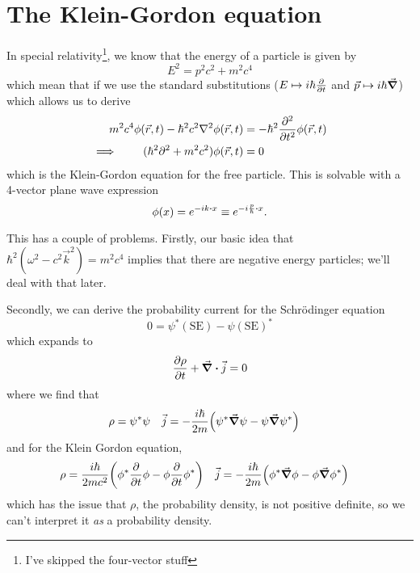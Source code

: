 \documentclass[]{revision-notes}
\begin{document}
\section{The Klein-Gordon equation}
In special relativity\footnote{I've skipped the four-vector stuff}, we know that the energy of a particle is given by
\[ E^2 = p^2 c^2 + m^2 c^4 \]
which mean that if we use the standard substitutions (\(E \mapsto i\hbar \pdv{t}\) and \(\vec{p}\mapsto i\hbar\grad\)) which allows us to derive
\begin{align*}
  m^2 c^4 \phi(\vec{r}, t) - \hbar^2 c^2 \laplacian \phi(\vec{r}, t) &= -\hbar^2 \pdv[2]{t}\phi(\vec{r}, t)\\
  \implies \qquad (\hbar^2\partial^2 + m^2 c^2)\phi(\vec{r}, t) &= 0
\end{align*}
which is the Klein-Gordon equation for the free particle. This is solvable with a 4-vector plane wave expression \[\phi(x) = e^{-ik\vdot x} \equiv e^{-i\frac{p}{\hbar}\vdot x}.\]

This has a couple of problems.
Firstly, our basic idea that \(\hbar^2( \omega^2 - c^2 \vec{k}^2 ) = m^2 c^4\) implies that there are negative energy particles; we'll deal with that later.

Secondly, we can derive the probability current for the Schr\"odinger equation \[0 = \psi^\ast (\text{SE})  - \psi (\text{SE})^\ast \] which expands to
\[\pdv{\rho}{t} + \div\vec{j} = 0\]
where we find that
\begin{align*}
  \rho &= \psi^\ast \psi & \vec{j} &= -\frac{i\hbar}{2m}\qty(\psi^\ast \grad\psi - \psi \grad\psi^\ast)
\end{align*}
and for the Klein Gordon equation,
\begin{align*}
  \rho &= \frac{i\hbar}{2mc^2}\qty(\phi^\ast \pdv{t}\phi - \phi \pdv{t}\phi^\ast) & \vec{j} &= -\frac{i\hbar}{2m}\qty(\phi^\ast \grad\phi - \phi \grad\phi^\ast)
\end{align*}
which has the issue that \(\rho\), the probability density, is not positive definite, so we can't interpret it \emph{as} a probability density.
\end{document}
